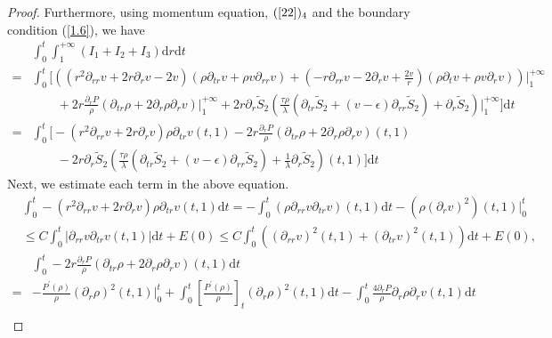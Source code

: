 \documentclass[10pt,reqno]{amsart}
\numberwithin{equation}{section}
\begin{document}
\begin{proof}
		Furthermore, using momentum equation, $(\ref{22})_4$ and the boundary condition (\ref{1.6}), we have 
		\begin{equation*}
			\begin{aligned}
				&\int_{0}^{t}\int_{1}^{+\infty}(I_1+I_2+I_3)\mathrm{d}r\mathrm{d}t\\
				=& \int_{0}^{t}\bigg[\left((r^2\partial_{rr}v+2r\partial_{r}v-2v)(\rho\partial_{tr}v+\rho v\partial_{rr}v) +(-r\partial_{rr}v-2\partial_{r}v+\frac{2v}{r})
				(\rho\partial_{t}v+\rho v \partial_{r}v)\right)\bigg|_{1}^{+\infty}\\
				&\qquad+2r\frac{\partial_{r}P}{\rho}(\partial_{tr}\rho+2\partial_{r}\rho\partial_{r}v)\bigg|_{1}^{+\infty}
				+2r\partial_{r}\tilde{S}_2\left(\frac{\tau\rho}{\lambda}\left(\partial_{tr} \tilde{S}_2+(v-\epsilon)\partial_{rr} \tilde{S}_2\right)+\partial_{r} \tilde{S}_2\right)\bigg|_{1}^{+\infty}\bigg]\mathrm{d}t\\
				=&\int_{0}^{t}
				\bigg[-(r^2\partial_{rr}v+2r\partial_{r}v)\rho\partial_{tr}v(t,1)
				-2r\frac{\partial_{r}P}{\rho}(\partial_{tr}\rho+2\partial_{r}\rho\partial_{r}v)(t,1)\\
				&\qquad-2r\partial_{r}\tilde{S}_2\left(\frac{\tau\rho}{\lambda}\left(\partial_{tr} \tilde{S}_2+(v-\epsilon)\partial_{rr} \tilde{S}_2\right)+\frac{1}{\lambda}\partial_{r} \tilde{S}_2\right)(t,1)\bigg]
				\mathrm{d}t
			\end{aligned}
		\end{equation*}
	Next, we estimate each term in the above equation.
		\begin{equation}\nonumber
			\begin{aligned}
				&\int_{0}^{t}-(r^2\partial_{rr}v+2r\partial_{r}v)\rho\partial_{tr}v(t,1)\mathrm{d}t
				=-\int_{0}^{t}(\rho\partial_{rr}v\partial_{tr}v)(t,1)\mathrm{d}t- (\rho(\partial_{r}v)^2)(t,1)\bigg|_0^t\\
				&
				\leq C\int_{0}^{t}|\partial_{rr}v\partial_{tr}v(t,1)|\mathrm{d}t+E(0)
				\leq C\int_{0}^{t}((\partial_{rr}v)^2(t,1)+(\partial_{tr}v)^2(t,1))\mathrm{d}t+E(0),
			\end{aligned}
		\end{equation}
		$$
		\begin{aligned}
			&\int_{0}^{t}-2r\frac{\partial_{r}P}{\rho}(\partial_{tr}\rho+2\partial_{r}\rho\partial_{r}v)(t,1)\mathrm{d}t\\
			=& -\frac{P^{\prime}(\rho)}{\rho}(\partial_{r}\rho)^2(t,1)\bigg|_0^t
			+\int_{0}^{t}[\frac{P^{\prime}(\rho)}{\rho}]_t(\partial_{r}\rho)^2(t,1)\mathrm{d}t-\int_{0}^{t}\frac{4\partial_{r}P}{\rho}\partial_{r}\rho\partial_{r}v(t,1)\mathrm{d}t\\

\end{aligned}$$
\end{proof}
\end{document}
